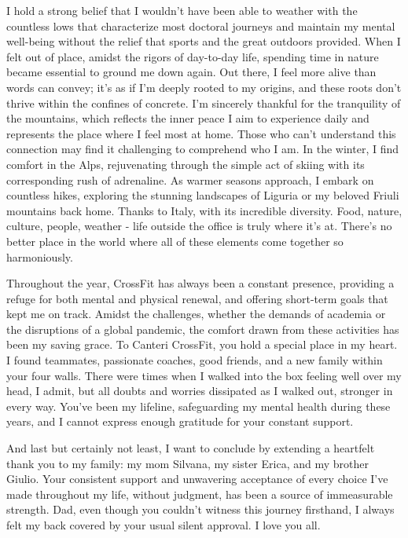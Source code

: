 \begin{addmargin}{-1.0cm}
I hold a strong belief that I wouldn't have been able to weather with the countless lows that characterize most doctoral journeys and maintain my mental well-being without the relief that sports and the great outdoors provided.
When I felt out of place, amidst the rigors of day-to-day life, spending time in nature became essential to ground me down again.
Out there, I feel more alive than words can convey; it's as if I'm deeply rooted to my origins, and these roots don't thrive within the confines of concrete. \linebreak
I'm sincerely thankful for the tranquility of the mountains, which reflects the inner peace I aim to experience daily and represents the place where I feel most at home.
Those who can't understand this connection may find it challenging to comprehend who I am. \linebreak
In the winter, I find comfort in the Alps, rejuvenating through the simple act of skiing with its corresponding rush of adrenaline.
As warmer seasons approach, I embark on countless hikes, exploring the stunning landscapes of Liguria or my beloved Friuli mountains back home.
Thanks to Italy, with its incredible diversity.
Food, nature, culture, people, weather - life outside the office is truly where it's at.
There's no better place in the world where all of these elements come together so harmoniously.

Throughout the year, CrossFit has always been a constant presence, providing a refuge for both mental and physical renewal, and offering short-term goals that kept me on track.
Amidst the challenges, whether the demands of academia or the disruptions of a global pandemic, the comfort drawn from these activities has been my saving grace.
To Canteri CrossFit, you hold a special place in my heart.
I found teammates, passionate coaches, good friends, and a new family within your four walls.
There were times when I walked into the box feeling well over my head, I admit, but all doubts and worries dissipated as I walked out, stronger in every way.
You've been my lifeline, safeguarding my mental health during these years, and I cannot express enough gratitude for your constant support.

And last but certainly not least, I want to conclude by extending a heartfelt thank you to my family: my mom Silvana, my sister Erica, and my brother Giulio.
Your consistent support and unwavering acceptance of every choice I've made throughout my life, without judgment, has been a source of immeasurable strength.
Dad, even though you couldn't witness this journey firsthand, I always felt my back covered by your usual silent approval. I love you all.

\end{addmargin}

\vfill
\endgroup
